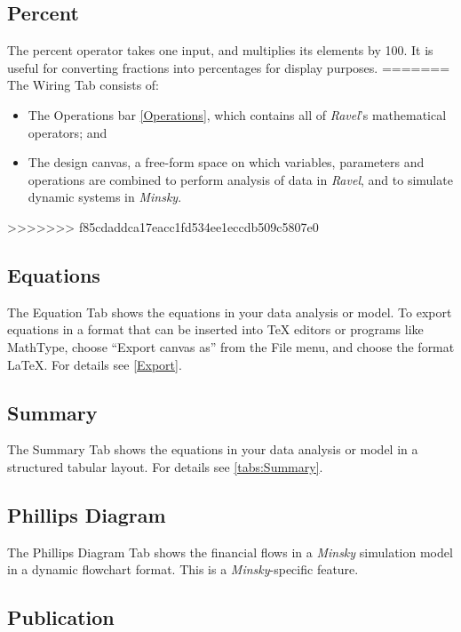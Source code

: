\subsection{Percent} \label{Operation:percent} The percent operator
takes one input, and multiplies its elements by 100. It is useful for
converting fractions into percentages for display purposes.
=======
The Wiring Tab consists of:
\begin{itemize}
\item The Operations bar \ref{Operations}, which contains all of \emph{Ravel}'s
mathematical operators; and
\item The design canvas, a free-form space on which variables, parameters
and operations are combined to perform analysis of data in \emph{Ravel},
and to simulate dynamic systems in \emph{Minsky}.
\end{itemize}
>>>>>>> f85cdaddca17eacc1fd534ee1eccdb509c5807e0

\subsection{Equations}

The Equation Tab shows the equations in your data analysis or model.
To export equations in a format that can be inserted into TeX editors
or programs like MathType, choose ``Export canvas as'' from the
File menu, and choose the format LaTeX. For details see \ref{Export}.

\subsection{Summary}

The Summary Tab shows the equations in your data analysis or model
in a structured tabular layout. For details see \ref{tabs:Summary}.

\subsection{Phillips Diagram}

The Phillips Diagram Tab shows the financial flows in a \emph{Minsky}
simulation model in a dynamic flowchart format. This is a \emph{Minsky}-specific
feature.

\subsection{Publication }

\label{tabs:Publication}

